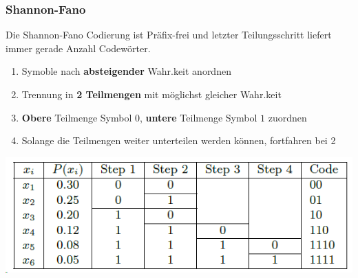 \subsubsection{Shannon-Fano}
Die Shannon-Fano Codierung ist Präfix-frei und letzter Teilungsschritt liefert immer gerade Anzahl Codewörter.
\begin{enumerate}[nosep]
	\item Symoble nach \textbf{absteigender} Wahr.keit anordnen
	\item Trennung in \textbf{2 Teilmengen} mit möglichst gleicher Wahr.keit
	\item \textbf{Obere} Teilmenge Symbol $0$, \textbf{untere} Teilmenge Symbol $1$ zuordnen
	\item Solange die Teilmengen weiter unterteilen werden können, fortfahren bei 2
\end{enumerate}
\begin{center}
	\includegraphics[width=\columnwidth]{Images/shannon-fano}
\end{center}

